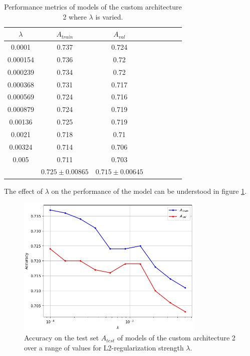 \begin{table}[ht]
\centering
\begin{tabular}{ |c|c|c|c|c|c|c|c| }
\hline
$\lambda$ & $A_{train}$ & $A_{val}$ \\
\hline
0.0001 & 0.737 & 0.724 \\
0.000154 & 0.736 & 0.72 \\
0.000239 & 0.734 & 0.72 \\
0.000368 & 0.731 & 0.717 \\
0.000569 & 0.724 & 0.716 \\
0.000879 & 0.724 & 0.719 \\
0.00136 & 0.725 & 0.719 \\
0.0021 & 0.718 & 0.71 \\
0.00324 & 0.714 & 0.706 \\
0.005 & 0.711 & 0.703 \\
\hline
 & $0.725\pm0.00865$ & $0.715\pm0.00645$ \\
\hline
\end{tabular}
\caption{Performance metrics of models of the custom architecture 2 where $\lambda$ is varied.}
\label{table:custom2_all}
\end{table}

The effect of $\lambda$ on the performance of the model can be understood in figure \ref{fig:custom2_lambda}.

\begin{figure}[ht]
    \centering
    \includegraphics[width=0.8\textwidth]{figs/custom2_lambda.png}
    \caption{Accuracy on the test set $A_{test}$ of models of the custom architecture 2 over a range of values for L2-regularization strength $\lambda$.}
    \label{fig:custom2_lambda}
\end{figure}

